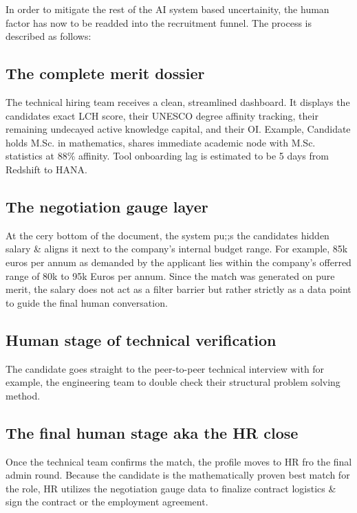 \documentclass[a4paper, 12pt]{article}
\begin{document}
In order to mitigate the rest of the AI system based uncertainity, the human factor has now to be readded into the recruitment funnel. The process is described as follows:

\subsection{The complete merit dossier}

The technical hiring team receives a clean, streamlined dashboard. It displays the candidates exact LCH score, their UNESCO degree affinity tracking, their remaining undecayed active knowledge capital, and their OI. Example, Candidate holds M.Sc. in mathematics, shares immediate academic node with M.Sc. statistics at 88\% affinity. Tool onboarding lag is estimated to be 5 days from Redshift to HANA.

\subsection{The negotiation gauge layer}

At the cery bottom of the document, the system pu;;s the candidates hidden salary \& aligns it next to the company's internal budget range. For example, 85k euros per annum as demanded by the applicant lies within the company's offerred range of 80k to 95k Euros per annum. Since the match was generated on pure merit, the salary does not act as a filter barrier but rather strictly as a data point to guide the final human conversation.

\subsection{Human stage of technical verification}

The candidate goes straight to the peer-to-peer technical interview with for example, the engineering team to double check their structural problem solving method.

\subsection{The final human stage aka the HR close}

Once the technical team confirms the match, the profile moves to HR fro the final admin round. Because the candidate is the mathematically proven best match for the role, HR utilizes the negotiation gauge data to finalize contract logistics \& sign the contract or the employment agreement.
\end{document}
